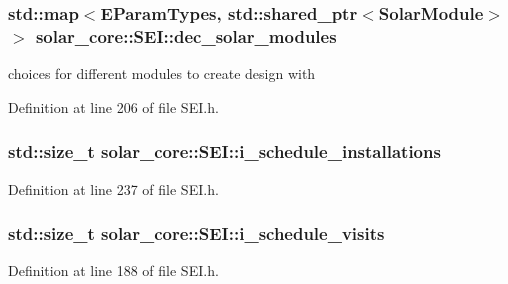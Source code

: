 \subsubsection[{dec\+\_\+solar\+\_\+modules}]{\setlength{\rightskip}{0pt plus 5cm}std\+::map$<${\bf E\+Param\+Types}, std\+::shared\+\_\+ptr$<${\bf Solar\+Module}$>$ $>$ solar\+\_\+core\+::\+S\+E\+I\+::dec\+\_\+solar\+\_\+modules\hspace{0.3cm}{\ttfamily [protected]}}\label{classsolar__core_1_1_s_e_i_a79728143af5752e09c2be29cfa1cfd8f}
choices for different modules to create design with 

Definition at line 206 of file S\+E\+I.\+h.

\hypertarget{classsolar__core_1_1_s_e_i_ad906dcd5b638e405a7daf14539096377}{}
\subsubsection[{i\+\_\+schedule\+\_\+installations}]{\setlength{\rightskip}{0pt plus 5cm}std\+::size\+\_\+t solar\+\_\+core\+::\+S\+E\+I\+::i\+\_\+schedule\+\_\+installations\hspace{0.3cm}{\ttfamily [protected]}}\label{classsolar__core_1_1_s_e_i_ad906dcd5b638e405a7daf14539096377}


Definition at line 237 of file S\+E\+I.\+h.

\hypertarget{classsolar__core_1_1_s_e_i_a3ff238346bd126ee39aa37bfee41be43}{}
\subsubsection[{i\+\_\+schedule\+\_\+visits}]{\setlength{\rightskip}{0pt plus 5cm}std\+::size\+\_\+t solar\+\_\+core\+::\+S\+E\+I\+::i\+\_\+schedule\+\_\+visits\hspace{0.3cm}{\ttfamily [protected]}}\label{classsolar__core_1_1_s_e_i_a3ff238346bd126ee39aa37bfee41be43}


Definition at line 188 of file S\+E\+I.\+h.

